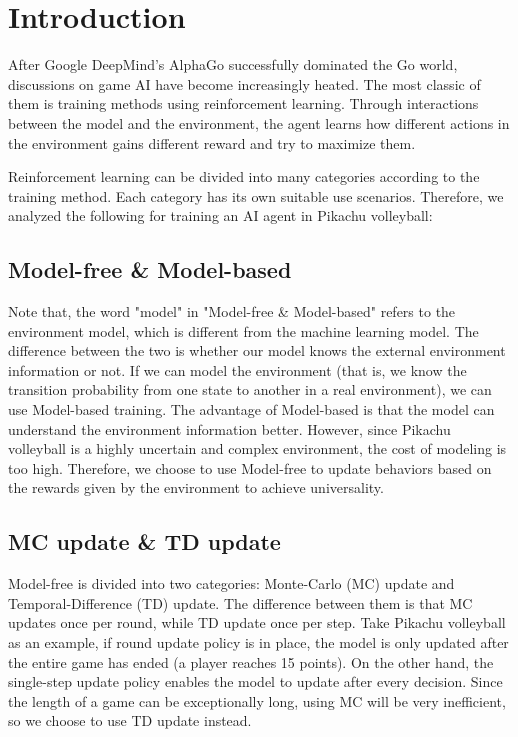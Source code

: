 \documentclass[sigconf]{acmart}
\begin{document}
\section{Introduction}
After Google DeepMind's AlphaGo successfully dominated the Go world, discussions on game AI have become increasingly heated. The most classic of them is training methods using reinforcement learning. Through interactions between the model and the environment, the agent learns how different actions in the environment gains different reward and try to maximize them.

Reinforcement learning can be divided into many categories according to the training method. Each category has its own suitable use scenarios. Therefore, we analyzed the following for training an AI agent in Pikachu volleyball:
\subsection{Model-free \& Model-based}
Note that, the word "model" in "Model-free \& Model-based" refers to the environment model, which is different from the machine learning model. The difference between the two is whether our model knows the external environment information or not. If we can model the environment (that is, we know the transition probability from one state to another in a real environment), we can use Model-based training. The advantage of Model-based is that the model can understand the environment information better. However, since Pikachu volleyball is a highly uncertain and complex environment, the cost of modeling is too high. Therefore, we choose to use Model-free to update behaviors based on the rewards given by the environment to achieve universality.

\subsection{MC update \& TD update}
Model-free is divided into two categories: Monte-Carlo (MC) update and Temporal-Difference (TD) update. The difference between them is that MC updates once per round, while TD update once per step. Take Pikachu volleyball as an example, if round update policy is in place, the model is only updated after the entire game has ended (a player reaches 15 points). On the other hand, the single-step update policy enables the model to update after every decision. Since the length of a game can be exceptionally long, using MC will be very inefficient, so we choose to use TD update instead.
\end{document}
